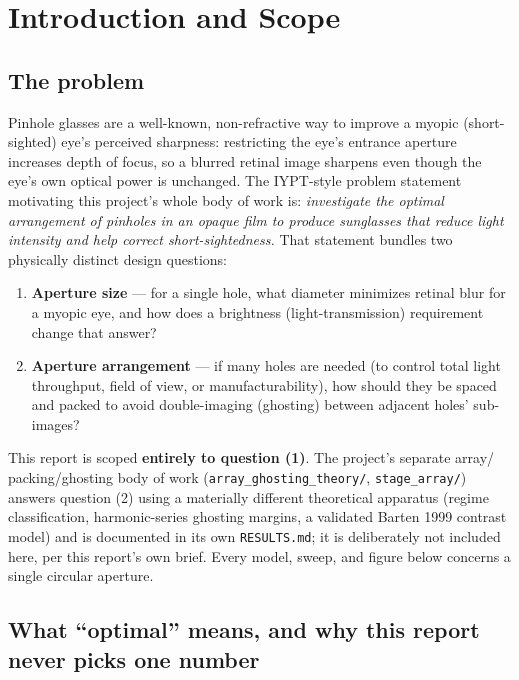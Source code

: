 \chapter{Introduction and Scope}
\label{ch:introduction}

\section{The problem}

Pinhole glasses are a well-known, non-refractive way to improve a myopic
(short-sighted) eye's perceived sharpness: restricting the eye's entrance aperture
increases depth of focus, so a blurred retinal image sharpens even though the eye's
own optical power is unchanged. The IYPT-style problem statement motivating this
project's whole body of work is: \emph{investigate the optimal arrangement of pinholes
in an opaque film to produce sunglasses that reduce light intensity and help correct
short-sightedness.} That statement bundles two physically distinct design questions:

\begin{enumerate}
\item \textbf{Aperture size} --- for a single hole, what diameter minimizes retinal
  blur for a myopic eye, and how does a brightness (light-transmission) requirement
  change that answer?
\item \textbf{Aperture arrangement} --- if many holes are needed (to control total
  light throughput, field of view, or manufacturability), how should they be spaced
  and packed to avoid double-imaging (ghosting) between adjacent holes' sub-images?
\end{enumerate}

This report is scoped \textbf{entirely to question (1)}. The project's separate array/
packing/ghosting body of work (\texttt{array\_ghosting\_theory/}, \texttt{stage\_array/})
answers question (2) using a materially different theoretical apparatus (regime
classification, harmonic-series ghosting margins, a validated Barten 1999 contrast
model) and is documented in its own \texttt{RESULTS.md}; it is deliberately not
included here, per this report's own brief. Every model, sweep, and figure below
concerns a single circular aperture.

\section{What ``optimal'' means, and why this report never picks one number}

